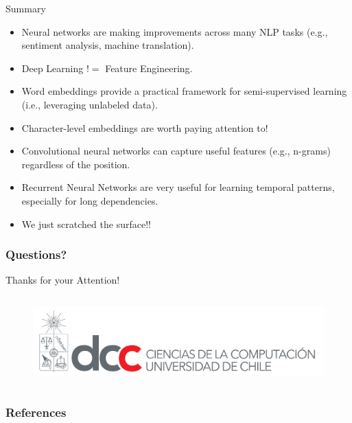 \documentclass[handout]{beamer}
\begin{document}
\begin{frame}{Summary}
\begin{scriptsize}
\begin{itemize}
\item Neural networks are making improvements across many NLP tasks (e.g., sentiment analysis, machine translation).
\item Deep Learning $!=$ Feature Engineering.
\item Word embeddings provide a practical framework for semi-supervised learning (i.e., leveraging unlabeled data).
\item Character-level embeddings are worth paying attention to!
\item Convolutional neural networks can capture useful features (e.g., n-grams) regardless of the position.
\item Recurrent Neural Networks are very useful for learning temporal patterns, especially for long dependencies.
\item We just scratched the surface!!
\end{itemize}
\end{scriptsize}


\end{frame}










\begin{frame}
\frametitle{Questions?}
\begin{center}\LARGE Thanks for your Attention!\\ \end{center}

\begin{columns}
\begin{column}{0.45\textwidth}
\vspace{1.5cm}

\begin{figure}[h!]
	\centering
	\includegraphics[scale=0.3]{pics/dcc.png}
\end{figure}
\end{column}
\end{columns}


\end{frame}

\begin{frame}[allowframebreaks]\scriptsize
\frametitle{References}


%
\end{frame}  


\end{document}
